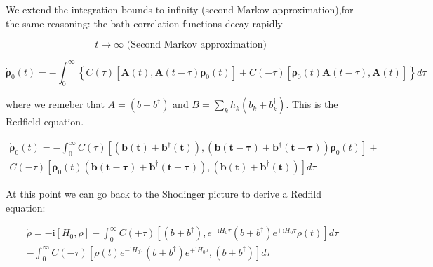 \documentclass[%
preprint,
onecolumn,
notitlepag,
 amsmath,amssymb,
 aps,
 pra,
]{revtex4-2}
\begin{document}
We extend the integration bounds
to infinity (second Markov approximation),for the same reasoning: the bath correlation
functions decay rapidly

\begin{equation}
t \rightarrow \infty \text { (Second Markov approximation) }
\end{equation}


\begin{equation}
\dot{\boldsymbol{\rho}}_0(t) = -\int_{0}^{\infty}\left\{C(\tau)\left[\boldsymbol{A}(t), \boldsymbol{A}(t-\tau) \boldsymbol{\rho}_{\mathrm{0}}(t)\right]+C(-\tau)\left[\boldsymbol{\rho}_{\mathrm{0}}(t) \boldsymbol{A}(t-\tau), \boldsymbol{A}(t)\right]\right\} d \tau
\end{equation}



where we remeber that $A= \left( b + b ^{\dagger} \right) $ and $B= \sum_k h_k \left( b_k + b_k ^{\dagger} \right)$. This is the Redfield equation. 


\begin{equation}\begin{align}
\dot{\boldsymbol{\rho}}_0(t) = - \int_{0}^{\infty} C(\tau)\left[\boldsymbol{\left( b(t) + b ^{\dagger}(t) \right)}, \left( \boldsymbol{ b(t-\tau) + b ^{\dagger} (t-\tau) }\right) \boldsymbol{\rho}_{\mathrm{0}}(t)\right]+ \\
C(-\tau)\left[\boldsymbol{\rho}_{\mathrm{0}}(t) \left( \boldsymbol{ b(t-\tau) + b ^{\dagger} (t-\tau) } \right), \boldsymbol{\left( b(t) + b ^{\dagger}(t) \right)}\right] d \tau 
\end{align}
\end{equation}






At this point we can go back to the Shodinger picture to derive a Redfild equation: 

\begin{equation}
\begin{aligned}
\dot{\rho}=-\mathrm{i}\left[H_{0}, \rho\right]-\int_{0}^{\infty} C(+\tau)\left[\left(b+b^{\dagger}\right), e^{-\mathrm{i} H_{0} \tau}\left(b+b^{\dagger}\right) e^{+\mathrm{i} H_{0} \tau} \rho(t)\right] d \tau \\
-\int_{0}^{\infty} C(-\tau)\left[\rho(t) e^{-\mathrm{i} H_{0} \tau}\left(b+b^{\dagger}\right) e^{+\mathrm{i} H_{0} \tau},\left(b+b^{\dagger}\right)\right] d \tau
\end{aligned}
\end{equation}
\end{document}
